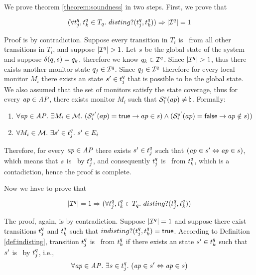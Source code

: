 We prove theorem \ref{theorem:soundness} in two steps. First, we prove that

$$(\forall t_j^q , t_k^q \in T_q .~ disting?(t_j^q , t_k^q)) \Rightarrow |\mathcal{I}^q| =1$$

Proof is by contradiction. Suppose every transition in $T_i$ is \indist~from all other transitions in $T_i$, and suppose $|\mathcal{I}^q| > 1$. Let $s$ be the global state of the system and suppose $\delta(q, s) = q_k$, therefore we know $q_k \in \mathcal{I}^q$. Since $|\mathcal{I}^q| > 1$, thus there exists another monitor state $q_j \in \mathcal{I}^q$. Since $q_j \in \mathcal{I}^q$ therefore for every local monitor $M_i$ there exists an state $s' \in t_j^q$ that is possible to be the global state. We also assumed that the set of monitors satisfy the state coverage, thus for every $\mathit{ap} \in \mathit{AP}$, there exists monitor $M_i$ such that $\mathcal{S}_i^s(\mathit{ap}) \neq \natural$. Formally:


\begin{enumerate}
\item $\forall \mathit{ap} \in \mathit{AP}. ~ \exists M_i \in \mathcal{M}.~ (\mathcal{S}_i^{s'}(ap) = \mathsf{true} \rightarrow ap \in s) \wedge  (\mathcal{S}_i^{s'}(ap) = \mathsf{false} \rightarrow ap \notin s) )$
\item $\forall M_i \in \mathcal{M}.~ \exists s' \in t_j^q.~ s' \in E_i$
\end{enumerate}


Therefore, for every $\mathit{ap} \in \mathit{AP}$ there exists $s' \in t_j^q$ such that $(\mathit{ap} \in s' \Leftrightarrow \mathit{ap} \in s)$, which means that $s$ is \covered~by $t_j^q$, and consequently $t_j^q$ is \indist~from $t_k^q$, which is a contadiction, hence the proof is complete.



Now we have to prove that

$$  |\mathcal{I}^q| =1   \Rightarrow  (\forall t_j^q , t_k^q \in T_q .~ disting?(t_j^q , t_k^q))$$

The proof, again, is by contradiction. Suppose $|\mathcal{I}^q| = 1$ and suppose there exist transitions $t_j^q$ and $t_k^q$ such that $indisting?(t_j^q, t_k^q) = \mathsf{true}$. According to Definition \ref{def:indisting}, transition $t_j^q$ 
is \indist~from $t_k^q$ if there exists an state $s' \in t_k^q$ 
such that $s'$ is \covered~by $t_j^q$, i.e.,
$$ \forall \mathit{ap} \in \mathit{AP}.~ \exists s \in t_j^q. ~(\mathit{ap} \in s' \Leftrightarrow \mathit{ap} \in s) $$

